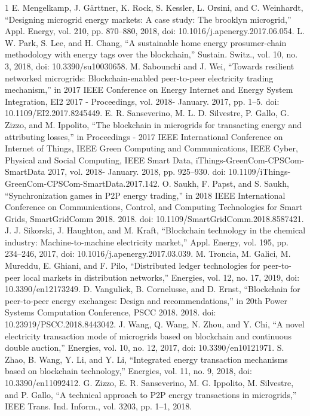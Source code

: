 \documentclass[lettersize,journal]{IEEEtran}
\begin{document}
\begin{thebibliography}{1}
\bibitem{}E. Mengelkamp, J. Gärttner, K. Rock, S. Kessler, L. Orsini, and C. Weinhardt, “Designing microgrid energy markets: A case study: The brooklyn microgrid,” Appl. Energy, vol. 210, pp. 870–880, 2018, doi: 10.1016/j.apenergy.2017.06.054.
\bibitem{}L. W. Park, S. Lee, and H. Chang, “A sustainable home energy prosumer-chain methodology with energy tags over the blockchain,” Sustain. Switz., vol. 10, no. 3, 2018, doi: 10.3390/su10030658.
\bibitem{}M. Sabounchi and J. Wei, “Towards resilient networked microgrids: Blockchain-enabled peer-to-peer electricity trading mechanism,” in 2017 IEEE Conference on Energy Internet and Energy System Integration, EI2 2017 - Proceedings, vol. 2018- January. 2017, pp. 1–5. doi: 10.1109/EI2.2017.8245449.
\bibitem{}E. R. Sanseverino, M. L. D. Silvestre, P. Gallo, G. Zizzo, and M. Ippolito, “The blockchain in microgrids for transacting energy and attributing losses,” in Proceedings - 2017 IEEE International Conference on Internet of Things, IEEE Green Computing and Communications, IEEE Cyber, Physical and Social Computing, IEEE Smart Data, iThings-GreenCom-CPSCom-SmartData 2017, vol. 2018- January. 2018, pp. 925–930. doi: 10.1109/iThings-GreenCom-CPSCom-SmartData.2017.142.
\bibitem{}O. Saukh, F. Papst, and S. Saukh, “Synchronization games in P2P energy trading,” in 2018 IEEE International Conference on Communications, Control, and Computing Technologies for Smart Grids, SmartGridComm 2018. 2018. doi: 10.1109/SmartGridComm.2018.8587421.
\bibitem{}J. J. Sikorski, J. Haughton, and M. Kraft, “Blockchain technology in the chemical industry: Machine-to-machine electricity market,” Appl. Energy, vol. 195, pp. 234–246, 2017, doi: 10.1016/j.apenergy.2017.03.039.
\bibitem{}M. Troncia, M. Galici, M. Mureddu, E. Ghiani, and F. Pilo, “Distributed ledger technologies for peer-to-peer local markets in distribution networks,” Energies, vol. 12, no. 17, 2019, doi: 10.3390/en12173249.
\bibitem{}D. Vangulick, B. Cornelusse, and D. Ernst, “Blockchain for peer-to-peer energy exchanges: Design and recommendations,” in 20th Power Systems Computation Conference, PSCC 2018. 2018. doi: 10.23919/PSCC.2018.8443042.
\bibitem{}J. Wang, Q. Wang, N. Zhou, and Y. Chi, “A novel electricity transaction mode of microgrids based on blockchain and continuous double auction,” Energies, vol. 10, no. 12, 2017, doi: 10.3390/en10121971.
\bibitem{}S. Zhao, B. Wang, Y. Li, and Y. Li, “Integrated energy transaction mechanisms based on blockchain technology,” Energies, vol. 11, no. 9, 2018, doi: 10.3390/en11092412.
\bibitem{}G. Zizzo, E. R. Sanseverino, M. G. Ippolito, M. Silvestre, and P. Gallo, “A technical approach to P2P energy transactions in microgrids,” IEEE Trans. Ind. Inform., vol. 3203, pp. 1–1, 2018.

\end{thebibliography}
\end{document}
